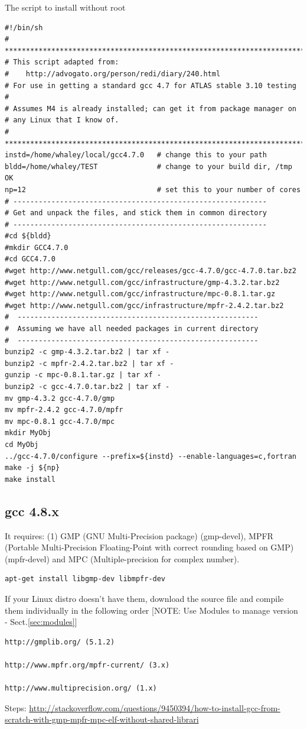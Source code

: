 The script to install without root 
\begin{verbatim}
#!/bin/sh
# ***************************************************************************
# This script adapted from:
#    http://advogato.org/person/redi/diary/240.html
# For use in getting a standard gcc 4.7 for ATLAS stable 3.10 testing
#
# Assumes M4 is already installed; can get it from package manager on
# any Linux that I know of.
# ***************************************************************************
instd=/home/whaley/local/gcc4.7.0   # change this to your path
bldd=/home/whaley/TEST              # change to your build dir, /tmp OK
np=12                               # set this to your number of cores
# ------------------------------------------------------------
# Get and unpack the files, and stick them in common directory
# ------------------------------------------------------------
#cd ${bldd}
#mkdir GCC4.7.0
#cd GCC4.7.0
#wget http://www.netgull.com/gcc/releases/gcc-4.7.0/gcc-4.7.0.tar.bz2
#wget http://www.netgull.com/gcc/infrastructure/gmp-4.3.2.tar.bz2
#wget http://www.netgull.com/gcc/infrastructure/mpc-0.8.1.tar.gz
#wget http://www.netgull.com/gcc/infrastructure/mpfr-2.4.2.tar.bz2
#  ---------------------------------------------------------
#  Assuming we have all needed packages in current directory
#  ---------------------------------------------------------
bunzip2 -c gmp-4.3.2.tar.bz2 | tar xf -
bunzip2 -c mpfr-2.4.2.tar.bz2 | tar xf -
gunzip -c mpc-0.8.1.tar.gz | tar xf -
bunzip2 -c gcc-4.7.0.tar.bz2 | tar xf -
mv gmp-4.3.2 gcc-4.7.0/gmp
mv mpfr-2.4.2 gcc-4.7.0/mpfr
mv mpc-0.8.1 gcc-4.7.0/mpc
mkdir MyObj
cd MyObj
../gcc-4.7.0/configure --prefix=${instd} --enable-languages=c,fortran
make -j ${np}
make install
\end{verbatim}



\subsection{gcc 4.8.x}
\label{sec:gcc-4.8.x-build}


It requires: (1) GMP (GNU Multi-Precision package) (gmp-devel), MPFR
(Portable Multi-Precision Floating-Point with correct rounding based on GMP)
(mpfr-devel) and MPC (Multiple-precision for complex number).
\begin{verbatim}
apt-get install libgmp-dev libmpfr-dev
\end{verbatim}

If your Linux distro doesn't have them, download the source file and compile them
individually in the following order [NOTE: Use Modules to manage version -
Sect.\ref{sec:modules}]
\begin{verbatim}
http://gmplib.org/ (5.1.2)

http://www.mpfr.org/mpfr-current/ (3.x)

http://www.multiprecision.org/ (1.x) 
\end{verbatim}
Steps:
\url{http://stackoverflow.com/questions/9450394/how-to-install-gcc-from-scratch-with-gmp-mpfr-mpc-elf-without-shared-librari}

